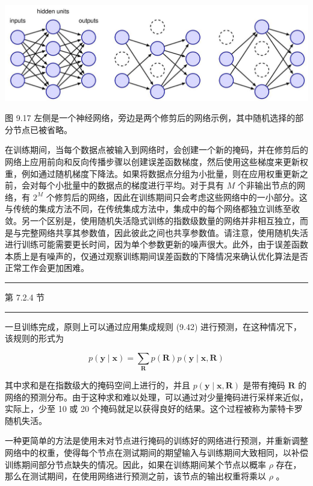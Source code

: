 \documentclass[10pt]{report}
\newcommand{\HRule}{\begin{center}\rule{0.9\linewidth}{0.2mm}\end{center}}
\begin{document}
\begin{center}
\includegraphics[max width=1.0\textwidth]{images/0194e279-9b28-703a-88f4-c3ac21e2010d_299_212_349_1381_438_0.jpg}
\end{center}
\hspace*{3em} 

图 9.17 左侧是一个神经网络，旁边是两个修剪后的网络示例，其中随机选择的部分节点已被省略。

在训练期间，当每个数据点被输入到网络时，会创建一个新的掩码，并在修剪后的网络上应用前向和反向传播步骤以创建误差函数梯度，然后使用这些梯度来更新权重，例如通过随机梯度下降法。如果将数据点分组为小批量，则在应用权重更新之前，会对每个小批量中的数据点的梯度进行平均。对于具有 \(M\) 个非输出节点的网络，有 \({2}^{M}\) 个修剪后的网络，因此在训练期间只会考虑这些网络中的一小部分。这与传统的集成方法不同，在传统集成方法中，集成中的每个网络都独立训练至收敛。另一个区别是，使用随机失活隐式训练的指数级数量的网络并非相互独立，而是与完整网络共享其参数值，因此彼此之间也共享参数值。请注意，使用随机失活进行训练可能需要更长时间，因为单个参数更新的噪声很大。此外，由于误差函数本质上是有噪声的，仅通过观察训练期间误差函数的下降情况来确认优化算法是否正常工作会更加困难。

\HRule

第 7.2.4 节

\HRule

一旦训练完成，原则上可以通过应用集成规则 (9.42) 进行预测，在这种情况下，该规则的形式为

\[
p\left( {\mathbf{y} \mid  \mathbf{x}}\right)  = \mathop{\sum }\limits_{\mathbf{R}}p\left( \mathbf{R}\right) p\left( {\mathbf{y} \mid  \mathbf{x},\mathbf{R}}\right)  \tag{9.51}
\]

其中求和是在指数级大的掩码空间上进行的，并且 \(p\left( {\mathbf{y} \mid  \mathbf{x},\mathbf{R}}\right)\) 是带有掩码 \(\mathbf{R}\) 的网络的预测分布。由于这种求和难以处理，可以通过对少量掩码进行采样来近似，实际上，少至 10 或 20 个掩码就足以获得良好的结果。这个过程被称为蒙特卡罗随机失活。

一种更简单的方法是使用未对节点进行掩码的训练好的网络进行预测，并重新调整网络中的权重，使得每个节点在测试期间的期望输入与训练期间大致相同，以补偿训练期间部分节点缺失的情况。因此，如果在训练期间某个节点以概率 \(\rho\) 存在，那么在测试期间，在使用网络进行预测之前，该节点的输出权重将乘以 \(\rho\) 。
\end{document}
